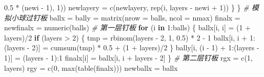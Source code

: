 \documentclass[]{tufte-book}
\newenvironment{Shaded}{}{}
\newcommand{\AttributeTok}[1]{\textcolor[rgb]{0.49,0.56,0.16}{#1}}
\newcommand{\CommentTok}[1]{\textcolor[rgb]{0.38,0.63,0.69}{\textit{#1}}}
\newcommand{\ControlFlowTok}[1]{\textcolor[rgb]{0.00,0.44,0.13}{\textbf{#1}}}
\newcommand{\DecValTok}[1]{\textcolor[rgb]{0.25,0.63,0.44}{#1}}
\newcommand{\FloatTok}[1]{\textcolor[rgb]{0.25,0.63,0.44}{#1}}
\newcommand{\FunctionTok}[1]{\textcolor[rgb]{0.02,0.16,0.49}{#1}}
\newcommand{\NormalTok}[1]{#1}
\newcommand{\OtherTok}[1]{\textcolor[rgb]{0.00,0.44,0.13}{#1}}
\newcommand{\SpecialCharTok}[1]{\textcolor[rgb]{0.25,0.44,0.63}{#1}}
\begin{document}
\begin{Shaded}
\begin{Highlighting}[]
                                                     \FloatTok{0.5} \SpecialCharTok{*}\NormalTok{ (newi }\SpecialCharTok{{-}} \DecValTok{1}\NormalTok{), }\DecValTok{1}\NormalTok{))}
\NormalTok{                newlayery }\OtherTok{=} \FunctionTok{c}\NormalTok{(newlayery, }\FunctionTok{rep}\NormalTok{(i, layers }\SpecialCharTok{{-}}\NormalTok{ newi }\SpecialCharTok{+} \DecValTok{1}\NormalTok{))}
\NormalTok{        \}}
\NormalTok{\}}
\CommentTok{\# 模拟小球过钉板}
\NormalTok{ballx }\OtherTok{=}\NormalTok{ bally }\OtherTok{=} \FunctionTok{matrix}\NormalTok{(}\AttributeTok{nrow =}\NormalTok{ balls, }\AttributeTok{ncol =}\NormalTok{ nmax)}
\NormalTok{finalx }\OtherTok{=}\NormalTok{ newfinalx }\OtherTok{=} \FunctionTok{numeric}\NormalTok{(balls)}
\CommentTok{\# 第一层钉板}
\ControlFlowTok{for}\NormalTok{ (i }\ControlFlowTok{in} \DecValTok{1}\SpecialCharTok{:}\NormalTok{balls) \{}
\NormalTok{        ballx[i, i] }\OtherTok{=}\NormalTok{ (}\DecValTok{1} \SpecialCharTok{+}\NormalTok{ layers)}\SpecialCharTok{/}\DecValTok{2}
        \ControlFlowTok{if}\NormalTok{ (layers }\SpecialCharTok{\textgreater{}} \DecValTok{2}\NormalTok{) \{}
\NormalTok{                tmp }\OtherTok{=} \FunctionTok{rbinom}\NormalTok{(layers }\SpecialCharTok{{-}} \DecValTok{2}\NormalTok{, }\DecValTok{1}\NormalTok{, }\FloatTok{0.5}\NormalTok{) }\SpecialCharTok{*} \DecValTok{2} \SpecialCharTok{{-}} \DecValTok{1}
\NormalTok{                ballx[i, i }\SpecialCharTok{+} \DecValTok{1}\SpecialCharTok{:}\NormalTok{(layers }\SpecialCharTok{{-}} \DecValTok{2}\NormalTok{)] }\OtherTok{=} \FunctionTok{cumsum}\NormalTok{(tmp) }\SpecialCharTok{*} \FloatTok{0.5} \SpecialCharTok{+} 
\NormalTok{                        (}\DecValTok{1} \SpecialCharTok{+}\NormalTok{ layers)}\SpecialCharTok{/}\DecValTok{2}
\NormalTok{        \}}
\NormalTok{        bally[i, (i }\SpecialCharTok{{-}} \DecValTok{1}\NormalTok{) }\SpecialCharTok{+} \DecValTok{1}\SpecialCharTok{:}\NormalTok{(layers }\SpecialCharTok{{-}} \DecValTok{1}\NormalTok{)] }\OtherTok{=}\NormalTok{ (layers }\SpecialCharTok{{-}} \DecValTok{1}\NormalTok{)}\SpecialCharTok{:}\DecValTok{1}
\NormalTok{        finalx[i] }\OtherTok{=}\NormalTok{ ballx[i, i }\SpecialCharTok{+}\NormalTok{ layers }\SpecialCharTok{{-}} \DecValTok{2}\NormalTok{]}
\NormalTok{\}}
\CommentTok{\# 第二层钉板}
\NormalTok{rgx }\OtherTok{=} \FunctionTok{c}\NormalTok{(}\DecValTok{1}\NormalTok{, layers)}
\NormalTok{rgy }\OtherTok{=} \FunctionTok{c}\NormalTok{(}\DecValTok{0}\NormalTok{, }\FunctionTok{max}\NormalTok{(}\FunctionTok{table}\NormalTok{(finalx)))}
\NormalTok{newballx }\OtherTok{=}\NormalTok{ ballx}

\end{Highlighting}
\end{Shaded}
\end{document}
